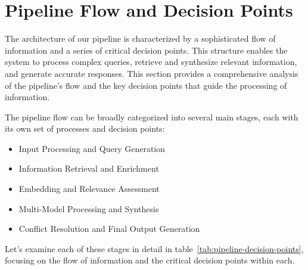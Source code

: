 \section{Pipeline Flow and Decision Points}\label{sec:pipeline-flow-and-decision-points}
The architecture of our pipeline is characterized by a sophisticated flow of information and a series of critical decision points.
This structure enables the system to process complex queries, retrieve and synthesize relevant information, and generate accurate responses.
This section provides a comprehensive analysis of the pipeline's flow and the key decision points that guide the processing of information.

The pipeline flow can be broadly categorized into several main stages, each with its own set of processes and decision points:
\begin{itemize}
    \item Input Processing and Query Generation
    \item Information Retrieval and Enrichment
    \item Embedding and Relevance Assessment
    \item Multi-Model Processing and Synthesis
    \item Conflict Resolution and Final Output Generation
\end{itemize}
Let's examine each of these stages in detail in table~\ref{tab:pipeline-decision-points}, focusing on the flow of information and the critical decision points within each.
